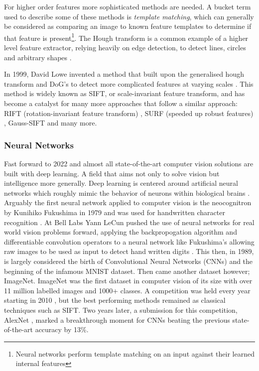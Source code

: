 For higher order features more sophisticated methods are needed.  A bucket term used to describe some of these methods is \textit{template matching},
which can generally be
considered as comparing an image to known feature templates to determine if that feature is present\footnote{Neural networks perform template matching
    on an input against their learned internal features}.  The Hough transform is a common example of a higher level feature extractor, relying heavily
on edge detection, to detect lines, circles and arbitrary shapes \cite{houghtransform}.

In 1999, David Lowe invented a method that built upon the generalised hough transform and DoG's to detect more complicated features at
varying scales \cite{lowe1999object}.
This method is widely known as SIFT, or scale-invariant feature transform, and has
become a catalyst for many more approaches that follow a similar approach: RIFT (rotation-invariant feature transform) \cite{rift}, SURF (speeded up robust features) \cite{bay2006surf},
Gauss-SIFT \cite{lindeberg2015image} and many more.

\subsubsection{Neural Networks}
Fast forward to 2022 and almost all state-of-the-art computer vision solutions are built with deep learning.  A field that aims not only to solve vision but intelligence
more generally.  Deep learning is centered around artificial neural networks which roughly mimic the behavior of neurons within biological brains \cite{eluyode2013comparative}.
Arguably the first neural network applied to computer vision is the neocognitron by Kunihiko Fukushima in 1979 and was used for handwritten character recognition \cite{fukushima1982neocognitron}.
At Bell Labs Yann LeCun pushed the use of neural networks for real world vision problems forward, applying the backpropogation algorithm and differentiable convolution operators to a 
neural network like Fukushima's allowing raw images to be used as input to detect hand written digits \cite{lecun1989backpropagation}.  
This then, in 1989, is largely considered the birth of Convolutional Neural Networks (CNNs) and the beginning of the infamous MNIST dataset.  Then came another
dataset however; ImageNet.  ImageNet was the first dataset in computer vision of its size with over 11 million labelled images and 1000+ classes.  A competition was
held every year starting in 2010 \cite{deng2009imagenet}, but the best performing methods remained as classical techniques such as SIFT.
Two years later, a submission for this competition, AlexNet \cite{krizhevsky2012imagenet}, marked a breakthrough moment for CNNs beating the previous
state-of-the-art accuracy by 13\%.

